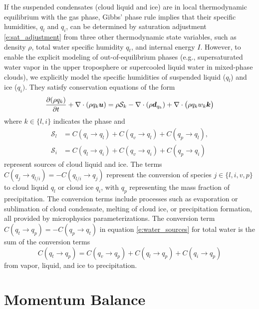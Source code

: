 \documentclass{report}
\begin{document}
If the suspended condensates (cloud liquid and ice) are in local thermodynamic equilibrium with the gas phase, Gibbs' phase rule implies that their specific humidities, $q_l$ and $q_i$, can be determined by saturation adjustment \eqref{e:sat_adjustment} from three other thermodynamic state variables, such as density $\rho$, total water specific humidity $q_t$, and internal energy $I$. However, to enable the explicit modeling of out-of-equilibrium phases (e.g., supersaturated water vapor in the upper troposphere or supercooled liquid water in mixed-phase clouds), we explicitly model the specific humidities of suspended liquid ($q_l$) and ice ($q_i)$. They satisfy conservation equations of the form
\begin{equation}
\frac{\partial (\rho q_k)}{\partial t} + \nabla \cdot (\rho q_k \boldsymbol{{u}}) = \rho \mathcal{S}_k  -\nabla \cdot (\rho \boldsymbol{{d}}_{q_k}) + \nabla \cdot \bigl(\rho q_k w_k \boldsymbol{{k}} \bigr)  
\label{eq:governing_equations/condensate}
\end{equation}
where $k \in \{l, i\}$ indicates the phase and 
\begin{align}
    \mathcal{S}_l & = C(q_i \rightarrow q_l) + C(q_v \rightarrow q_l) + C(q_p \rightarrow q_l), \\
    \mathcal{S}_i & = C(q_l \rightarrow q_i) + C(q_v \rightarrow q_i) + C(q_p \rightarrow q_i)
\end{align}
represent sources of cloud liquid and ice. The terms $C(q_j \rightarrow q_{l/i}) = - C(q_{l/i} \rightarrow q_j)$ represent the conversion of species $j \in \{l, i, v, p\}$ to cloud liquid $q_l$ or cloud ice $q_i$, with $q_p$ representing the mass fraction of precipitation. The conversion terms include processes such as evaporation or sublimation of cloud condensate, melting of cloud ice, or precipitation formation, all provided by microphysics parameterizations. The conversion term $C(q_t \rightarrow q_p) = -C(q_p \rightarrow q_t)$ in equation \eqref{e:water_sources} for total water is the sum of the conversion terms
\begin{equation}
    C(q_t \rightarrow q_p) = C(q_v \rightarrow q_p) + C(q_l \rightarrow q_p) + C(q_i \rightarrow q_p)
\end{equation}
from vapor, liquid, and ice to precipitation. 

\section{Momentum Balance}
\end{document}
